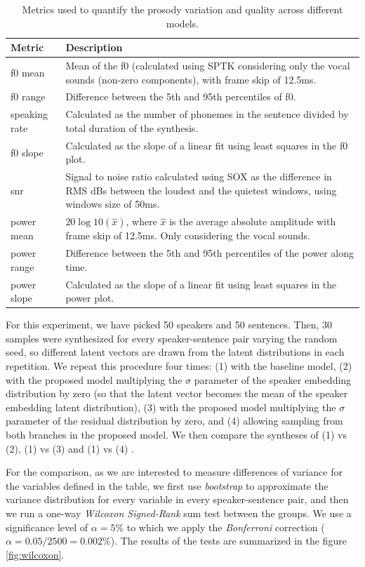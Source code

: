 	
\begin{table}
	\footnotesize
		\centering
	\caption{Metrics used to quantify the prosody variation and quality across different models.}
	\begin{tabular}{p{}|p{}}
		\toprule
		Metric & Description \\
		\midrule
		f0 mean &  Mean of the f0 (calculated using SPTK \cite{sptk} considering only the vocal sounds (non-zero components), with frame skip of 12.5ms.\\
		f0 range & Difference between the 5th and 95th percentiles of f0. \\
		speaking rate & Calculated as the number of phonemes in the sentence divided by total duration of the synthesis. \\
		f0 slope & Calculated as the slope of a linear fit using least squares in the f0 plot. \\
		snr & Signal to noise ratio calculated using SOX \cite{SOX} as the difference in RMS dBs between the loudest and the quietest windows, using windows size of 50ms. \\
		power mean & $20\log10(\hat{x})$, where $\hat{x}$ is the average absolute amplitude with frame skip of 12.5ms. Only considering the vocal sounds. \\
		power range & Difference between the 5th and 95th percentiles of the power along time. \\
		power slope & Calculated as the slope of a linear fit using least squares in the power plot. \\
		\bottomrule
	\end{tabular}
	\label{tab:metrics}
\end{table}
	
For this experiment, we have picked 50 speakers and 50 sentences. Then, 30 samples were synthesized for every speaker-sentence pair varying the random seed, so different latent vectors are drawn from the latent distributions in each repetition. We repeat this procedure four times: (1) with the baseline model, (2) with the proposed model multiplying the $\sigma$ parameter of the speaker embedding distribution by zero (so that the latent vector becomes the mean of the speaker embedding latent distribution), (3) with the proposed model multiplying the $\sigma$ parameter of the residual distribution by zero, and (4) allowing sampling from both branches in the proposed model. We then compare the syntheses of (1) vs (2), (1) vs (3) and (1) vs (4) .

For the comparison, as we are interested to measure differences of variance for the variables defined in the table, we first use \textit{bootstrap} to approximate the variance distribution for every variable in every speaker-sentence pair, and then we run a one-way \textit{Wilcoxon Signed-Rank} sum test between the groups. We use a significance level of $\alpha=5\%$ to which we apply the \textit{Bonferroni} correction ($\alpha=0.05/2500=0.002\%$). The results of the tests are summarized in the figure \ref{fig:wilcoxon}.

